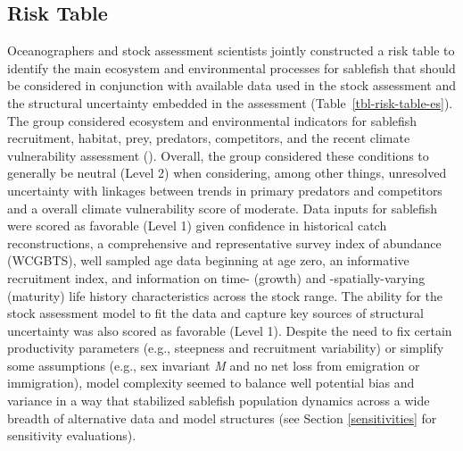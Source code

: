 \documentclass[
  english,
]{article}
\begin{document}
\subsection*{Risk Table}\label{risk-table}

Oceanographers and stock assessment scientists jointly constructed a
risk table to identify the main ecosystem and environmental processes
for sablefish that should be considered in conjunction with available
data used in the stock assessment and the structural uncertainty
embedded in the assessment (Table~\ref{tbl-risk-table-es}). The group
considered ecosystem and environmental indicators for sablefish
recruitment, habitat, prey, predators, competitors, and the recent
climate vulnerability assessment
(). Overall, the
group considered these conditions to generally be neutral (Level 2) when
considering, among other things, unresolved uncertainty with linkages
between trends in primary predators and competitors and a overall
climate vulnerability score of moderate. Data inputs for sablefish were
scored as favorable (Level 1) given confidence in historical catch
reconstructions, a comprehensive and representative survey index of
abundance (WCGBTS), well sampled age data beginning at age zero, an
informative recruitment index, and information on time- (growth) and
-spatially-varying (maturity) life history characteristics across the
stock range. The ability for the stock assessment model to fit the data
and capture key sources of structural uncertainty was also scored as
favorable (Level 1). Despite the need to fix certain productivity
parameters (e.g., steepness and recruitment variability) or simplify
some assumptions (e.g., sex invariant \emph{M} and no net loss from
emigration or immigration), model complexity seemed to balance well
potential bias and variance in a way that stabilized sablefish
population dynamics across a wide breadth of alternative data and model
structures (see Section \ref{sensitivities} for sensitivity
evaluations).

\newpage{}

\begingroup
\fontsize{6.0pt}{7.0pt}\selectfont
\end{document}
